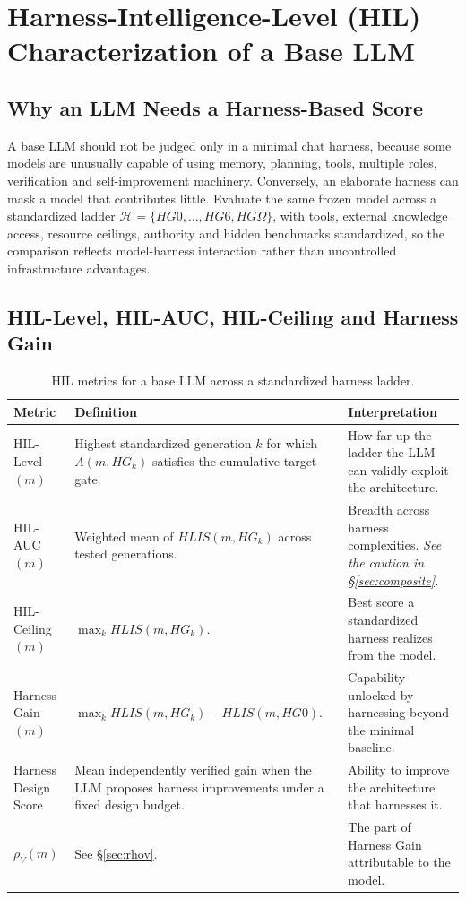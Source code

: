 \documentclass[11pt]{article}
\theoremstyle{definition}
\newcommand{\Om}{\ensuremath{\Omega}}
\newcommand{\rhov}{\ensuremath{\rho_V}}
\begin{document}
\section{Harness-Intelligence-Level (HIL) Characterization of a Base LLM}

\subsection{Why an LLM Needs a Harness-Based Score}

A base LLM should not be judged only in a minimal chat harness, because some models are unusually capable of using memory, planning, tools, multiple roles, verification and self-improvement machinery. Conversely, an elaborate harness can mask a model that contributes little. Evaluate the same frozen model across a standardized ladder $\mathcal{H} = \{HG0, \ldots, HG6, HG\Om{}\}$, with tools, external knowledge access, resource ceilings, authority and hidden benchmarks standardized, so the comparison reflects model-harness interaction rather than uncontrolled infrastructure advantages.

\subsection{HIL-Level, HIL-AUC, HIL-Ceiling and Harness Gain}

\begin{table}[H]
\centering\small
\begin{tabularx}{\textwidth}{@{}lYY@{}}
\toprule
Metric & Definition & Interpretation \\
\midrule
HIL-Level$(m)$ & Highest standardized generation $k$ for which $A(m,HG_k)$ satisfies the cumulative target gate. & How far up the ladder the LLM can validly exploit the architecture. \\
HIL-AUC$(m)$ & Weighted mean of $HLIS(m,HG_k)$ across tested generations. & Breadth across harness complexities. \emph{See the caution in \S\ref{sec:composite}.} \\
HIL-Ceiling$(m)$ & $\max_k HLIS(m,HG_k)$. & Best score a standardized harness realizes from the model. \\
Harness Gain$(m)$ & $\max_k HLIS(m,HG_k) - HLIS(m,HG0)$. & Capability unlocked by harnessing beyond the minimal baseline. \\
Harness Design Score & Mean independently verified gain when the LLM proposes harness improvements under a fixed design budget. & Ability to improve the architecture that harnesses it. \\
\textbf{$\rhov{}(m)$} & See \S\ref{sec:rhov}. & The part of Harness Gain attributable to the model. \\
\bottomrule
\end{tabularx}
\caption{HIL metrics for a base LLM across a standardized harness ladder.}
\label{tab:hilmetrics}
\end{table}
\end{document}
